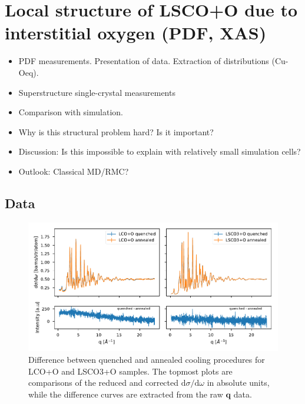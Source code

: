 \chapter{Local structure of LSCO+O due to interstitial oxygen (PDF, XAS)}

\begin{framed}
	\begin{itemize}
		\item PDF measurements. Presentation of data. Extraction of distributions (Cu-Oeq).
		\item Superstructure single-crystal measurements
		\item Comparison with simulation.
		\item Why is this structural problem hard? Is it important?
		\item Discussion: Is this impossible to explain with relatively small simulation cells?
		\item Outlook: Classical MD/RMC?
	\end{itemize}
\end{framed}

\section{Data}

\begin{figure}[H]
    \centering
    \includegraphics[width=\textwidth]{fig/pdf/quenched_annealed.pdf}
    \caption{Difference between quenched and annealed cooling procedures for LCO+O and LSCO3+O samples. The topmost plots are comparisons of the reduced and corrected $\text{d}\sigma/\text{d}\omega$ in absolute units, while the difference curves are extracted from the raw $\bm{q}$ data.}
    \label{fig:difference}
\end{figure}

